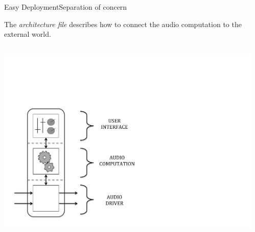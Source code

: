 \begin{frame}{Easy Deployment}{Separation of concern}

    The \emph{architecture file} describes how to connect the audio computation to the external world.
    
    \begin{columns}[t]
    
    \begin{column}{0.25\textwidth}
        \begin{center}
         \includegraphics[height=0.425\textheight]{images/FL-Faust_Construction3}
         \end{center}
    
    \end{column}
    \begin{column}{0.75\textwidth}
    

\end{column}
\end{columns}
\end{frame}
